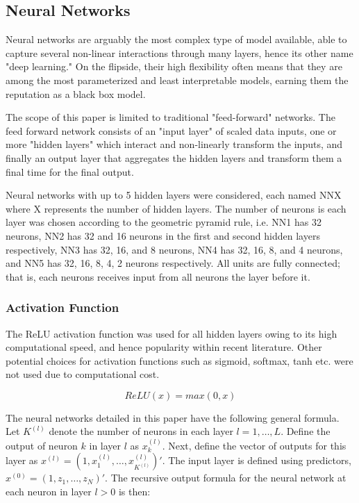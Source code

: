 \documentclass[man, a4paper, biblatex]{article}
\begin{document}
\subsection{Neural Networks}

Neural networks are arguably the most complex type of model available, able to capture several non-linear interactions through many layers, hence its other name "deep learning." On the flipside, their high flexibility often means that they are among the most parameterized and least interpretable models, earning them the reputation as a black box model.

The scope of this paper is limited to traditional "feed-forward" networks. The feed forward network consists of an "input layer" of scaled data inputs, one or more "hidden layers" which interact and non-linearly transform the inputs, and finally an output layer that aggregates the hidden layers and transform them a final time for the final output. 

Neural networks with up to 5 hidden layers were considered, each named NNX where X represents the number of hidden layers. The number of neurons is each layer was chosen according to the geometric pyramid rule, i.e. NN1 has 32 neurons, NN2 has 32 and 16 neurons in the first and second hidden layers respectively, NN3 has 32, 16, and 8 neurons, NN4 has 32, 16, 8, and 4 neurons, and NN5 has 32, 16, 8, 4, 2 neurons respectively. All units are fully connected; that is, each neurons receives input from all neurons the layer before it.

\subsubsection{Activation Function}

The ReLU activation function was used for all hidden layers owing to its high computational speed, and hence popularity within recent literature. Other potential choices for activation functions such as sigmoid, softmax, tanh etc. were not used due to computational cost.

\begin{equation}
	ReLU(x) = max(0, x)
\end{equation}

The neural networks detailed in this paper have the following general formula. Let $K^(l)$ denote the number of neurons in each layer $l = 1, \dots, L$. Define the output of neuron $k$ in layer $l$ as $x_k^(l)$. Next, define the vector of outputs for this layer as $x^(l) = (1, x_1^(l), \dots, x_{K^(l)}^(l))'$. The input layer is defined using predictors, $x^(0) = (1, z_1, \dots, z_N)'$. The recursive output formula for the neural network at each neuron in layer $l > 0$ is then:
\end{document}
